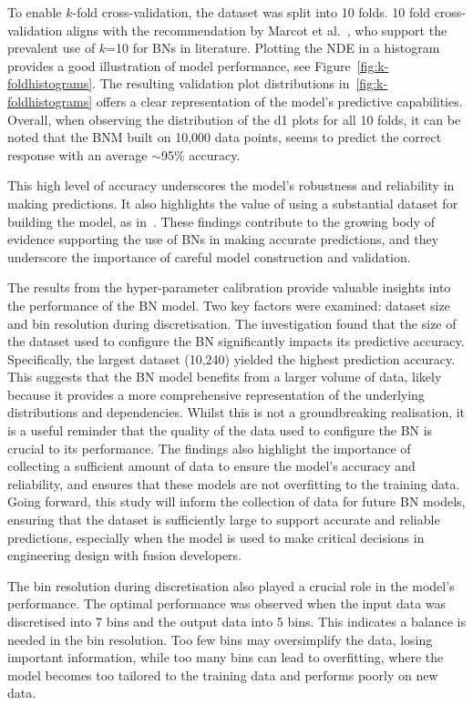 \documentclass[journal]{IEEEtran}
\begin{document}
To enable $k$-fold cross-validation, the dataset was split into 10 folds. 10 fold cross-validation aligns with the recommendation by Marcot et al.~\cite{Marcot2021}, who support the prevalent use of $k$=10 for BNs in literature. Plotting the NDE in a histogram provides a good illustration of model performance, see Figure~\ref{fig:k-foldhistograms}. The resulting validation plot distributions in~\ref{fig:k-foldhistograms} offers a clear representation of the model's predictive capabilities. Overall, when observing the distribution of the d1 plots for all 10 folds, it can be noted that the BNM built on 10,000 data points, seems to predict the correct response with an average $\sim$95\% accuracy.

This high level of accuracy underscores the model's robustness and reliability in making predictions. It also highlights the value of using a substantial dataset for building the model, as in~\cite{Griffiths2024}. These findings contribute to the growing body of evidence supporting the use of BNs in making accurate predictions, and they underscore the importance of careful model construction and validation.

The results from the hyper-parameter calibration provide valuable insights into the performance of the BN model. Two key factors were examined: dataset size and bin resolution during discretisation. The investigation found that the size of the dataset used to configure the BN significantly impacts its predictive accuracy. Specifically, the largest dataset (10,240) yielded the highest prediction accuracy. This suggests that the BN model benefits from a larger volume of data, likely because it provides a more comprehensive representation of the underlying distributions and dependencies. Whilst this is not a groundbreaking realisation, it is a useful reminder that the quality of the data used to configure the BN is crucial to its performance. The findings also highlight the importance of collecting a sufficient amount of data to ensure the model's accuracy and reliability, and ensures that these models are not overfitting to the training data. Going forward, this study will inform the collection of data for future BN models, ensuring that the dataset is sufficiently large to support accurate and reliable predictions, especially when the model is used to make critical decisions in engineering design with fusion developers.

The bin resolution during discretisation also played a crucial role in the model's performance. The optimal performance was observed when the input data was discretised into 7 bins and the output data into 5 bins. This indicates a balance is needed in the bin resolution. Too few bins may oversimplify the data, losing important information, while too many bins can lead to overfitting, where the model becomes too tailored to the training data and performs poorly on new data.
\end{document}
